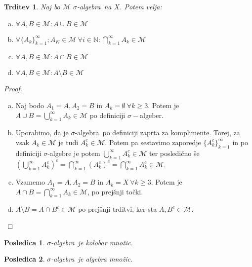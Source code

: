 \documentclass[a4paper, 10pt]{article}
\newtheorem{trditev}{Trditev}
\newtheorem{posl}{Posledica}
\newcommand{\mth}[1]{\ensuremath{\mathbb{#1}}}
\newcommand{\N}{\mth{N}}
\newcommand{\Mu}{\mathcal{M}}
\newcommand{\sigalg}{$\sigma$-algebra~}
\begin{document}
		\begin{trditev}
			Naj bo $\Mu$ \sigalg na $X$. Potem velja: \begin{enumerate}[a)]
				\item $\forall A, B\in \Mu: A\cup B \in \Mu$
				\item $\forall \{A_k\}_{k=1}^\infty; A_K\in\Mu~\forall i\in\N: \bigcap_{k = 1}^\infty A_k \in \Mu$
				\item $\forall A, B\in \Mu: A\cap B \in \Mu$
				\item $\forall A, B\in \Mu: A\setminus B \in \Mu$
			\end{enumerate}
		\end{trditev}
		\begin{proof}
			\begin{enumerate}[a)]
				\item Naj bodo $A_1 = A, A_2 = B$ in $A_k = \emptyset~\forall k \geq 3$. Potem je $A\cup B = \bigcup_{k = 1}^\infty A_k \in\Mu$ po definiciji $\sigma-$algeber.
				\item Uporabimo, da je \sigalg po definiciji zaprta za komplimente. Torej, za vsak $A_k \in \Mu$ je tudi $A_k^c \in \Mu$. Potem pa sestavimo zaporedje $\{A_k^c\}_{k=1}^\infty$ in po definiciji $\sigma$-algebre je potem $\bigcup_{k = 1}^\infty A_k^c \in \Mu$ ter posledično še $\left(\bigcup_{k = 1}^\infty A_k^c\right)^c = \bigcap_{k = 1}^\infty (A_k^c)^c = \bigcap_{k = 1}^\infty A_k^c \in \Mu$.
				\item Vzamemo $A_1 = A, A_2 = B$ in $A_k = X~\forall k\geq 3$. Potem je $A\cap B = \bigcap_{k = 1}^\infty A_k \in \Mu$, po prejšnji točki.
				\item $A\setminus B = A\cap B^c \in \Mu$ po prejšnji trditvi, ker sta $A, B^c \in \Mu$.
			\end{enumerate}
		\end{proof}
		\begin{posl}
			\sigalg je kolobar množic.
		\end{posl}
		\begin{posl}
			\sigalg je algebra množic.
		\end{posl}
		
		\newpage
		
\end{document}
